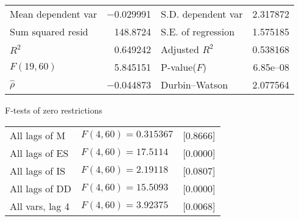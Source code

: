 \documentclass[11pt]{article}
\begin{document}
\begin{center}
\vspace{1ex}
\begin{tabular}{lrlr}
Mean dependent var & $-$0.029991 & S.D. dependent var &  2.317872 \\
Sum squared resid &  148.8724 & S.E. of regression &  1.575185 \\
$R^2$ &  0.649242 & Adjusted $R^2$ &  0.538168 \\
$F(19, 60)$ &  5.845151 & P-value($F$) &  6.85\textrm{e--08} \\
$\hat{\rho}$ & $-$0.044873 & Durbin--Watson &  2.077564 \\
\end{tabular}


\end{center}

\begin{center}
F-tests of zero restrictions\\[1em]
\begin{tabular}{lll}
All lags of M & $F(4, 60) = 0.315367$ & [0.8666]\\
All lags of ES & $F(4, 60) = 17.5114$ & [0.0000]\\
All lags of IS & $F(4, 60) = 2.19118$ & [0.0807]\\
All lags of DD & $F(4, 60) = 15.5093$ & [0.0000]\\
All vars, lag 4 & $F(4, 60) = 3.92375$ & [0.0068]\\
\end{tabular}
\end{center}

\clearpage
\end{document}
